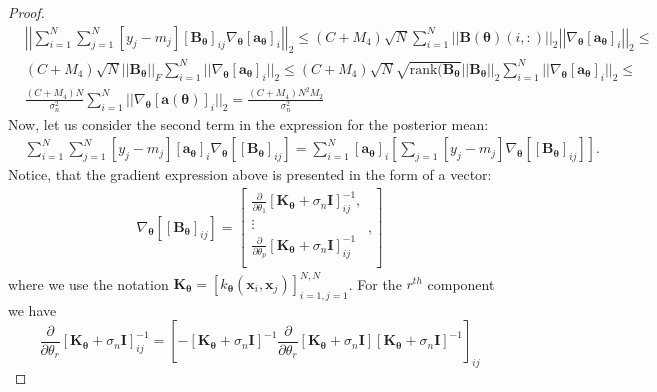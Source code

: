 \documentclass[jair,twoside,11pt,theapa]{article}
\theoremstyle{definition}
\begin{document}
\begin{proof}
\begin{align}
\label{part_prev_11}
    &\left|\left|\sum_{i=1}^N\sum_{j=1}^N[y_j - m_j][\bm{B}_{\bm{\theta}}]_{ij}\nabla_{\bm{\theta}}[\bm{a}_{\bm{\theta}}]_i\right|\right|_2 \le
    (C+M_4)\sqrt{N}\sum_{i=1}^N||\bm{B}(\bm{\theta})(i,:)||_2\left|\left|\nabla_{\bm{\theta}}[\bm{a}_{\bm{\theta}}]_i\right|\right|_2 \le\\\nonumber
    &(C+M_4)\sqrt{N}||\bm{B}_{\bm{\theta}}||_F\sum_{i=1}^N||\nabla_{\bm{\theta}}[\boldsymbol{a}_{\bm{\theta}}]_i||_2 \le \nonumber
    (C+M_4)\sqrt{N}\sqrt{\text{rank}(\bm{B}_{\bm{\theta}}}||\bm{B}_{\bm{\theta}}||_2\sum_{i=1}^N||\nabla_{\bm{\theta}}[\bm{a}_{\bm{\theta}}]_i||_2 \le \\\nonumber
    &\frac{(C+M_4)N}{\sigma^2_{n}}\sum_{i=1}^N||\nabla_{\boldsymbol{\theta}}[\boldsymbol{a}(\boldsymbol{\theta})]_i||_2 = \frac{(C+M_4)N^2M_2}{\sigma^2_{n}}
\end{align}
Now, let us consider the second term in the expression for the posterior mean:
\begin{align*}
    &\sum_{i=1}^N\sum_{j=1}^N[y_j - m_j][\bm{a}_{\bm{\theta}}]_i\nabla_{\bm{\theta}}\left[[\bm{B}_{\bm{\theta}}]_{ij}\right] = \nonumber
    \sum_{i=1}^N[\bm{a}_{\bm{\theta}}]_i\left[\sum_{j=1}[y_j - m_j]\nabla_{\boldsymbol{\theta}}\left[[\bm{B}_{\bm{\theta}}]_{ij}\right]\right].
\end{align*}
Notice, that the gradient expression above is presented in the form of a vector:
\begin{align*}
    \nabla_{\bm{\theta}}\left[[\bm{B}_{\bm{\theta}}]_{ij}\right]  = \left[\begin{array}{c}
      \frac{\partial}{\partial\theta_1}\left[\bm{K}_{\boldsymbol{\theta}} + \sigma_{n}\boldsymbol{I}\right]^{-1}_{ij}, \\
      \vdots \\
      \frac{\partial}{\partial\theta_p}\left[\bm{K}_{\boldsymbol{\theta}} + \sigma_{n}\boldsymbol{I}\right]^{-1}_{ij}\\ 
        \end{array},
    \right]
\end{align*}
where we use the notation $\bm{K}_{\bm{\theta}} = [k_{\bm{\theta}}(\bm{x}_i, \bm{x}_j)]^{N,N}_{i=1,j=1}$. For the $r^{th}$ component we have
\begin{equation}
\label{Eq:interm_result}
    \frac{\partial}{\partial\theta_r}\left[\bm{K}_{\boldsymbol{\theta}} + \sigma_{n}\boldsymbol{I}\right]^{-1}_{ij} = 
    \left[-\left[\bm{K}_{\boldsymbol{\theta}} + \sigma_{n}\boldsymbol{I}\right]^{-1}\frac{\partial}{\partial\theta_r}\left[\bm{K}_{\boldsymbol{\theta}} + \sigma_{n}\boldsymbol{I}\right]\left[\bm{K}_{\boldsymbol{\theta}} + \sigma_{n}\boldsymbol{I}\right]^{-1}\right]_{ij}

\end{equation}
\end{proof}
\end{document}
